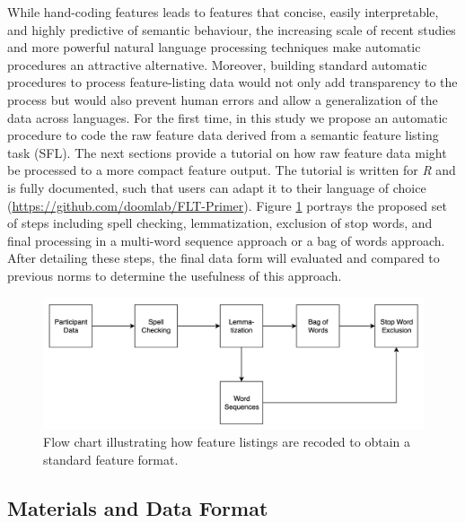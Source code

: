 \documentclass[man]{apa6}
\begin{document}
While hand-coding features leads to features that concise, easily interpretable, and highly predictive of semantic behaviour, the increasing scale of recent studies and more powerful natural language processing techniques make automatic procedures an attractive alternative. Moreover, building standard automatic procedures to process feature-listing data would not only add transparency to the process but would also prevent human errors and allow a generalization of the data across languages. For the first time, in this study we propose an automatic procedure to code the raw feature data derived from a semantic feature listing task (SFL). The next sections provide a tutorial on how raw feature data might be processed to a more compact feature output. The tutorial is written for \emph{R} and is fully documented, such that users can adapt it to their language of choice (\url{https://github.com/doomlab/FLT-Primer}). Figure \ref{fig:flowchart} portrays the proposed set of steps including spell checking, lemmatization, exclusion of stop words, and final processing in a multi-word sequence approach or a bag of words approach. After detailing these steps, the final data form will evaluated and compared to previous norms to determine the usefulness of this approach.

\begin{figure}
\includegraphics[width=5.28in]{flow_chart} \caption{Flow chart illustrating how feature listings are recoded to obtain a standard feature format.}\label{fig:flowchart}
\end{figure}

\hypertarget{materials-and-data-format}{%
\subsection{Materials and Data Format}\label{materials-and-data-format}}
\end{document}
